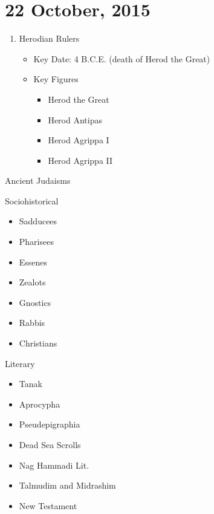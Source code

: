 \documentclass{article}
\begin{document}
    \section{22 October, 2015}

    \begin{enumerate}
        \item Herodian Rulers \\
            \begin{itemize}
                \item Key Date: 4 B.C.E. (death of Herod the Great)
                \item Key Figures \\
                    \begin{itemize}
                        \item Herod the Great
                        \item Herod Antipas
                        \item Herod Agrippa I
                        \item Herod Agrippa II
                    \end{itemize}
            \end{itemize}
    \end{enumerate}

    \centerline{Ancient Judaisms}

    Sociohistorical

    \begin{itemize}
        \item Sadducees
        \item Pharisees
        \item Essenes
        \item Zealots
        \item Gnostics
        \item Rabbis
        \item Christians
    \end{itemize}

    Literary

    \begin{itemize}
        \item Tanak
        \item Aprocypha
        \item Pseudepigraphia
        \item Dead Sea Scrolls
        \item Nag Hammadi Lit.
        \item Talmudim and Midrashim
        \item New Testament
    \end{itemize}
\end{document}

